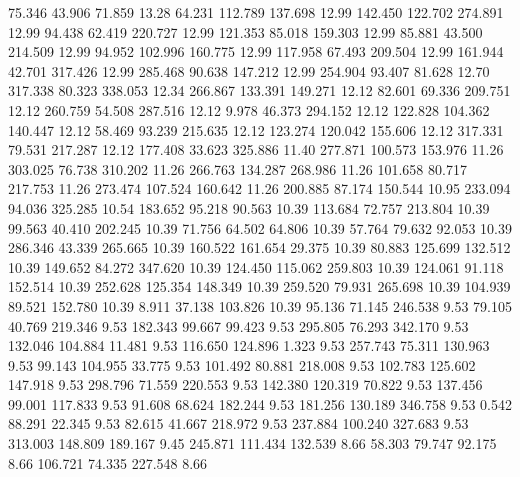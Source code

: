   75.346   43.906   71.859        13.28
  64.231  112.789  137.698        12.99
 142.450  122.702  274.891        12.99
  94.438   62.419  220.727        12.99
 121.353   85.018  159.303        12.99
  85.881   43.500  214.509        12.99
  94.952  102.996  160.775        12.99
 117.958   67.493  209.504        12.99
 161.944   42.701  317.426        12.99
 285.468   90.638  147.212        12.99
 254.904   93.407   81.628        12.70
 317.338   80.323  338.053        12.34
 266.867  133.391  149.271        12.12
  82.601   69.336  209.751        12.12
 260.759   54.508  287.516        12.12
   9.978   46.373  294.152        12.12
 122.828  104.362  140.447        12.12
  58.469   93.239  215.635        12.12
 123.274  120.042  155.606        12.12
 317.331   79.531  217.287        12.12
 177.408   33.623  325.886        11.40
 277.871  100.573  153.976        11.26
 303.025   76.738  310.202        11.26
 266.763  134.287  268.986        11.26
 101.658   80.717  217.753        11.26
 273.474  107.524  160.642        11.26
 200.885   87.174  150.544        10.95
 233.094   94.036  325.285        10.54
 183.652   95.218   90.563        10.39
 113.684   72.757  213.804        10.39
  99.563   40.410  202.245        10.39
  71.756   64.502   64.806        10.39
  57.764   79.632   92.053        10.39
 286.346   43.339  265.665        10.39
 160.522  161.654   29.375        10.39
  80.883  125.699  132.512        10.39
 149.652   84.272  347.620        10.39
 124.450  115.062  259.803        10.39
 124.061   91.118  152.514        10.39
 252.628  125.354  148.349        10.39
 259.520   79.931  265.698        10.39
 104.939   89.521  152.780        10.39
   8.911   37.138  103.826        10.39
  95.136   71.145  246.538         9.53
  79.105   40.769  219.346         9.53
 182.343   99.667   99.423         9.53
 295.805   76.293  342.170         9.53
 132.046  104.884   11.481         9.53
 116.650  124.896    1.323         9.53
 257.743   75.311  130.963         9.53
  99.143  104.955   33.775         9.53
 101.492   80.881  218.008         9.53
 102.783  125.602  147.918         9.53
 298.796   71.559  220.553         9.53
 142.380  120.319   70.822         9.53
 137.456   99.001  117.833         9.53
  91.608   68.624  182.244         9.53
 181.256  130.189  346.758         9.53
   0.542   88.291   22.345         9.53
  82.615   41.667  218.972         9.53
 237.884  100.240  327.683         9.53
 313.003  148.809  189.167         9.45
 245.871  111.434  132.539         8.66
  58.303   79.747   92.175         8.66
 106.721   74.335  227.548         8.66
